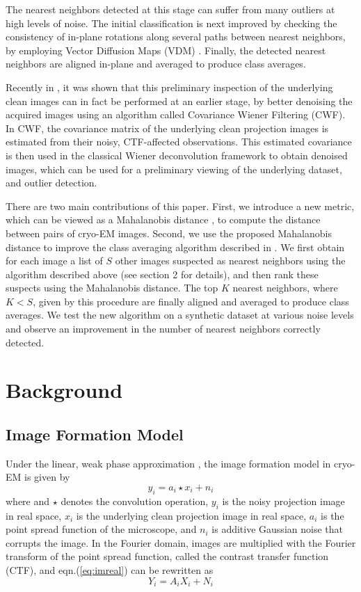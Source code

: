 \documentclass{article}
\begin{document}
The nearest neighbors detected at this stage can suffer from many outliers at high levels of noise. The initial classification is next improved by checking the consistency of in-plane rotations along several paths between nearest neighbors, by employing Vector Diffusion Maps (VDM) \cite{vdm}. Finally, the detected nearest neighbors are aligned in-plane and averaged to produce class averages. 

Recently in \cite{cwf}, it was shown that this preliminary inspection of the underlying clean images can in fact be performed at an earlier stage, by better denoising the acquired images using an algorithm called Covariance Wiener Filtering (CWF). In CWF, the covariance matrix of the underlying clean projection images is estimated from their noisy, CTF-affected observations. This estimated covariance is then used in the classical Wiener deconvolution framework to obtain denoised images, which can be used for a preliminary viewing of the underlying dataset, and outlier detection. 

There are two main contributions of this paper. First, we introduce a new metric, which can be viewed as a Mahalanobis distance \cite{mah}, to compute the distance between pairs of cryo-EM images. Second, we use the proposed Mahalanobis distance to improve the class averaging algorithm described in \cite{zhao}. We first obtain for each image a list of $S$ other images suspected as nearest neighbors using the algorithm described above (see section 2 for details), and then rank these suspects using the Mahalanobis distance. The top $K$ nearest neighbors, where $K<S$, given by this procedure are finally aligned and averaged to produce class averages. We test the new algorithm on a synthetic dataset at various noise levels and observe an improvement in the number of nearest neighbors correctly detected.

\section{Background}
\subsection{Image Formation Model}
Under the linear, weak phase approximation \cite{frankbook}, the image formation model in cryo-EM is given by
\begin{equation}
y_i = a_i\star x_i + n_i
\label{eq:imreal}
\end{equation}
where and $\star$ denotes the convolution operation, $y_i$ is the noisy projection image in real space, $x_i$ is the underlying clean projection image in real space, $a_i$ is the point spread function of the microscope, and $n_i$ is additive Gaussian noise that corrupts the image. In the Fourier domain, images are multiplied with the Fourier transform of the point spread function, called the contrast transfer function (CTF), and eqn.(\ref{eq:imreal}) can be rewritten as
\begin{equation}
Y_i = A_iX_i + N_i
\label{eq:imfour}
\end{equation}
\end{document}
